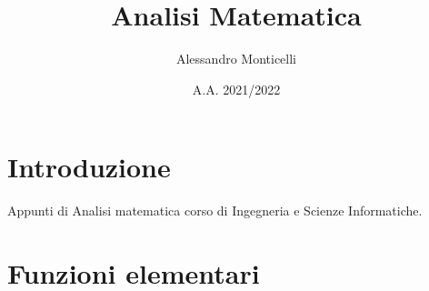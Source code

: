 \documentclass{article}
\title{Analisi Matematica}
\author{Alessandro Monticelli}
\date{A.A. 2021/2022}
\begin{document}
  
\maketitle
\newpage
\tableofcontents
\newpage
\section*{Introduzione}
    Appunti di Analisi matematica \- corso di Ingegneria e Scienze Informatiche.
\newpage
    
    
    
    
    
    
\section{Funzioni elementari}
    
    
    
    
\end{document}
